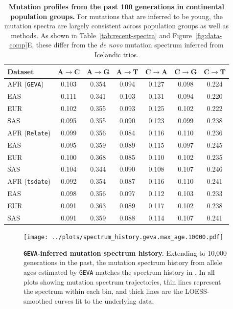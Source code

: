 \documentclass[]{article}
\newcommand{\GEVA}{\texttt{GEVA}\xspace}
\newcommand{\tsdate}{\texttt{tsdate}\xspace}
\newcommand{\relate}{\texttt{Relate}\xspace}
\begin{document}
\begin{table}[h]
    \centering
    \begin{tabular}[t]{l|cccccc}
        \toprule
        Dataset & A$\rightarrow$C & A$\rightarrow$G & A$\rightarrow$T &
            C$\rightarrow$A & C$\rightarrow$G & C$\rightarrow$T \\
        \midrule
        AFR (\GEVA) & 0.103 & 0.354 & 0.094 & 0.127 & 0.098 & 0.224 \\
        EAS & 0.111 & 0.341 & 0.103 & 0.131 & 0.094 & 0.220 \\
        EUR & 0.102 & 0.355 & 0.093 & 0.125 & 0.102 & 0.222 \\
        SAS & 0.095 & 0.355 & 0.090 & 0.123 & 0.099 & 0.238 \\
        \midrule
        AFR (\relate) & 0.099 & 0.356 & 0.084 & 0.116 & 0.110 & 0.236 \\
        EAS & 0.095 & 0.359 & 0.089 & 0.115 & 0.097 & 0.245 \\
        EUR & 0.100 & 0.368 & 0.085 & 0.110 & 0.102 & 0.235 \\
        SAS & 0.104 & 0.344 & 0.090 & 0.108 & 0.107 & 0.246 \\
        \midrule
        AFR (\tsdate) & 0.092 & 0.354 & 0.087 & 0.116 & 0.110 & 0.241 \\
        EAS & 0.098 & 0.356 & 0.097 & 0.112 & 0.103 & 0.233 \\
        EUR & 0.091 & 0.363 & 0.089 & 0.117 & 0.102 & 0.238 \\
        SAS & 0.091 & 0.359 & 0.088 & 0.114 & 0.107 & 0.241 \\
        \bottomrule
    \end{tabular}
    \caption{
        \label{tab:population-spectra}
        \textbf{Mutation profiles from the past 100 generations in continental
        population groups.}
        For mutations that are inferred to be young,
        the mutation spectra are largely consistent across population groups
        as well as methods.
        As shown in Table~\ref{tab:recent-spectra} and Figure~\ref{fig:data-comp}E,
        these differ from the \emph{de novo}  mutation spectrum inferred from 
        Icelandic trios.
    }
\end{table}

\clearpage

\begin{figure}[ht!]
    \centering
    \texttt{[image: ../plots/spectrum\_history.geva.max\_age.10000.pdf]}
    \caption{
        \textbf{\GEVA-inferred mutation spectrum history.}
        Extending to 10,000 generations in the past, the mutation spectrum history
        from allele ages estimated by \GEVA matches the spectrum history in
        \citet{wang2023human}.
        In all plots showing mutation spectrum trajectories, thin lines represent
        the spectrum within each bin, and thick lines are the LOESS-smoothed
        curves fit to the underlying data.
    }
    \label{fig:geva-spectra}
\end{figure}
\end{document}
